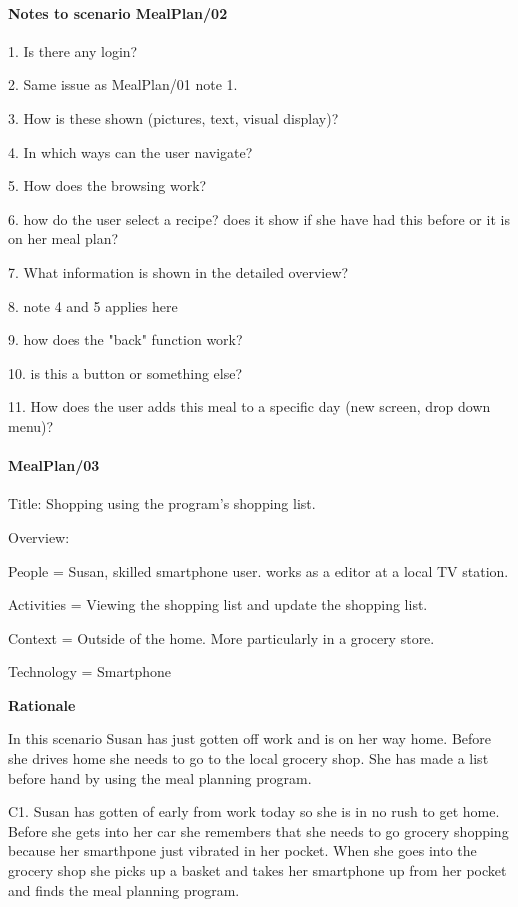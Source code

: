 \paragraph{Notes to scenario MealPlan/02}

1. Is there any login?

2. Same issue as MealPlan/01 note 1.

3. How is these shown (pictures, text, visual display)?

4. In which ways can the user navigate?

5. How does the browsing work?

6. how do the user select a recipe? does it show if she have had this before or it is on her meal 
plan?

7. What information is shown in the detailed overview?

8. note 4 and 5 applies here

9. how does the "back" function work?

10. is this a button or something else?

11. How does the user adds this meal to a specific day (new screen, drop down menu)?

\paragraph{MealPlan/03}

Title: Shopping using the program's shopping list.

Overview:

	People = Susan, skilled smartphone user. works as a editor at a local TV station. 
	
	Activities = Viewing the shopping list and update the shopping list.

	Context = Outside of the home. More particularly in a grocery store.

	Technology = Smartphone
	
\textbf{Rationale}

In this scenario Susan has just gotten off work and is on her way home. Before she drives home she needs to go to the local grocery shop. She has made a list before hand by using the meal planning program.

	C1. Susan has gotten of early from work today so she is in no rush to get home. Before she gets into her car she remembers that she needs to go grocery shopping because her smarthpone just vibrated in her pocket. When she goes into the grocery shop she picks up a basket and takes her smartphone up from her pocket and finds the meal planning program.
	
